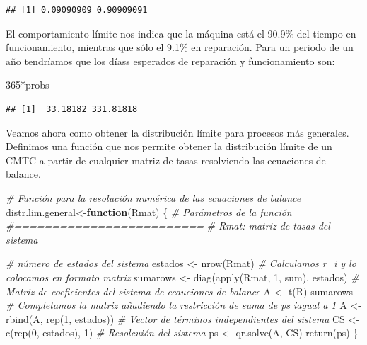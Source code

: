 \documentclass[
]{book}
\newenvironment{Shaded}{\begin{snugshade}}{\end{snugshade}}
\newcommand{\CommentTok}[1]{\textcolor[rgb]{0.56,0.35,0.01}{\textit{#1}}}
\newcommand{\ControlFlowTok}[1]{\textcolor[rgb]{0.13,0.29,0.53}{\textbf{#1}}}
\newcommand{\DecValTok}[1]{\textcolor[rgb]{0.00,0.00,0.81}{#1}}
\newcommand{\FunctionTok}[1]{\textcolor[rgb]{0.00,0.00,0.00}{#1}}
\newcommand{\NormalTok}[1]{#1}
\newcommand{\OtherTok}[1]{\textcolor[rgb]{0.56,0.35,0.01}{#1}}
\newcommand{\SpecialCharTok}[1]{\textcolor[rgb]{0.00,0.00,0.00}{#1}}
\theoremstyle{definition}
\theoremstyle{definition}
\theoremstyle{definition}
\theoremstyle{definition}
\theoremstyle{remark}
\begin{document}
\begin{verbatim}
## [1] 0.09090909 0.90909091
\end{verbatim}

El comportamiento límite nos indica que la máquina está el 90.9\% del tiempo en funcionamiento, mientras que sólo el 9.1\% en reparación. Para un periodo de un año tendríamos que los díass esperados de reparación y funcionamiento son:

\begin{Shaded}
\begin{Highlighting}[]
\DecValTok{365}\SpecialCharTok{*}\NormalTok{probs}
\end{Highlighting}
\end{Shaded}

\begin{verbatim}
## [1]  33.18182 331.81818
\end{verbatim}

Veamos ahora como obtener la distribución límite para procesos más generales. Definimos una función que nos permite obtener la distribución límite de un CMTC a partir de cualquier matriz de tasas resolviendo las ecuaciones de balance.

\begin{Shaded}
\begin{Highlighting}[]
\CommentTok{\# Función para la resolución numérica de las ecuaciones de balance}
\NormalTok{distr.lim.general}\OtherTok{\textless{}{-}}\ControlFlowTok{function}\NormalTok{(Rmat)}
\NormalTok{\{}
  \CommentTok{\# Parámetros de la función}
  \CommentTok{\#=========================}
  \CommentTok{\# Rmat: matriz de tasas del sistema}
  
  \CommentTok{\# número de estados del sistema}
\NormalTok{  estados }\OtherTok{\textless{}{-}} \FunctionTok{nrow}\NormalTok{(Rmat)}
  \CommentTok{\# Calculamos r\_i y lo colocamos en formato matriz}
\NormalTok{  sumarows }\OtherTok{\textless{}{-}} \FunctionTok{diag}\NormalTok{(}\FunctionTok{apply}\NormalTok{(Rmat, }\DecValTok{1}\NormalTok{, sum), estados)}
  \CommentTok{\# Matriz de coeficientes del sistema de ecauciones de balance}
\NormalTok{  A }\OtherTok{\textless{}{-}} \FunctionTok{t}\NormalTok{(R)}\SpecialCharTok{{-}}\NormalTok{sumarows}
  \CommentTok{\# Completamos la matriz añadiendo la restricción de suma de p\textasciigrave{}s iagual a 1}
\NormalTok{  A }\OtherTok{\textless{}{-}} \FunctionTok{rbind}\NormalTok{(A, }\FunctionTok{rep}\NormalTok{(}\DecValTok{1}\NormalTok{, estados))}
  \CommentTok{\# Vector de términos independientes del sistema}
\NormalTok{  CS }\OtherTok{\textless{}{-}} \FunctionTok{c}\NormalTok{(}\FunctionTok{rep}\NormalTok{(}\DecValTok{0}\NormalTok{, estados), }\DecValTok{1}\NormalTok{)}
  \CommentTok{\# Resolcuión del sistema}
\NormalTok{  ps }\OtherTok{\textless{}{-}} \FunctionTok{qr.solve}\NormalTok{(A, CS)}
  \FunctionTok{return}\NormalTok{(ps)}
\NormalTok{\}}
\end{Highlighting}
\end{Shaded}
\end{document}
